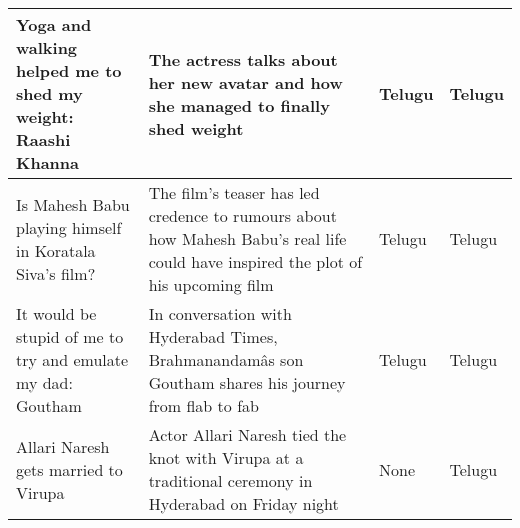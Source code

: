 \begin{itemize}
\begin{table}
\begin{center}
\begin{longtable}{|p{3cm}|p{7cm}|p{1.5cm}|p{1.5cm}|}
  Yoga and walking helped me to shed my weight: Raashi Khanna& The actress talks about her new avatar and how she managed to finally shed weight&  Telugu& Telugu\\ \hline
  Is Mahesh Babu playing himself in Koratala Siva's film?& The film's teaser has led credence to rumours about how Mahesh Babu's real life could have inspired the plot of his upcoming film&  Telugu& Telugu\\ \hline
  It would be stupid of me to try and emulate my dad: Goutham& In conversation with Hyderabad Times, Brahmanandamâs son Goutham shares his journey  from flab to fab&  Telugu& Telugu\\ \hline
  Allari Naresh gets married to Virupa&Actor Allari Naresh tied the knot with Virupa at a traditional ceremony in Hyderabad on Friday night&  None& Telugu\\ \hline
 \end{longtable}
\end{center}
\end{table}


\end{itemize}
